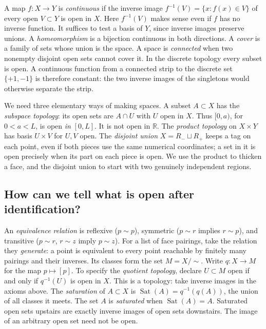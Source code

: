 A map $f:X\to Y$ is \emph{continuous} if the inverse image $f^{-1}(V)=\{x:f(x)\in V\}$ of every open $V\subset Y$ is open in $X$. Here $f^{-1}(V)$ makes sense even if $f$ has no inverse function. It suffices to test a basis of $Y$, since inverse images preserve unions. A \emph{homeomorphism} is a bijection continuous in both directions. A \emph{cover} is a family of sets whose union is the space. A space is \emph{connected} when two nonempty disjoint open sets cannot cover it. In the discrete topology every subset is open. A continuous function from a connected strip to the discrete set $\{+1,-1\}$ is therefore constant: the two inverse images of the singletons would otherwise separate the strip.

We need three elementary ways of making spaces. A subset $A\subset X$ has the \emph{subspace topology}: its open sets are $A\cap U$ with $U$ open in $X$. Thus $[0,a)$, for $0<a<L$, is open \emph{in} $[0,L]$. It is not open in $\mathbb R$. The \emph{product topology} on $X\times Y$ has basis $U\times V$ for $U,V$ open. The \emph{disjoint union} $X=R_-\sqcup R_+$ keeps a tag on each point, even if both pieces use the same numerical coordinates; a set in it is open precisely when its part on each piece is open. We use the product to thicken a face, and the disjoint union to start with two genuinely independent regions.

\subsection{How can we tell what is open after identification?}
An \emph{equivalence relation} is reflexive ($p\sim p$), symmetric ($p\sim r$ implies $r\sim p$), and transitive ($p\sim r$, $r\sim z$ imply $p\sim z$). For a list of face pairings, take the relation they \emph{generate}: a point is equivalent to every point reachable by finitely many pairings and their inverses. Its classes form the set $M=X/{\sim}$. Write $q:X\to M$ for the map $p\mapsto[p]$. To specify the \emph{quotient topology}, declare $U\subset M$ open if and only if $q^{-1}(U)$ is open in $X$. This is a topology: take inverse images in the axioms above. The \emph{saturation} of $A\subset X$ is $\operatorname{Sat}(A)=q^{-1}(q(A))$, the union of all classes it meets. The set $A$ is \emph{saturated} when $\operatorname{Sat}(A)=A$. Saturated open sets upstairs are exactly inverse images of open sets downstairs. The image of an arbitrary open set need not be open.

